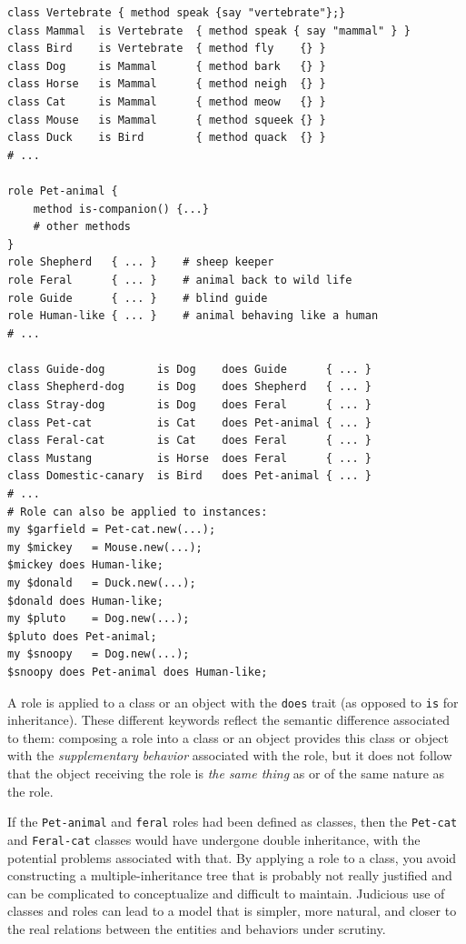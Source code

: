 \begin{verbatim}
class Vertebrate { method speak {say "vertebrate"};}
class Mammal  is Vertebrate  { method speak { say "mammal" } }
class Bird    is Vertebrate  { method fly    {} }
class Dog     is Mammal      { method bark   {} }
class Horse   is Mammal      { method neigh  {} }
class Cat     is Mammal      { method meow   {} }
class Mouse   is Mammal      { method squeek {} }
class Duck    is Bird        { method quack  {} }
# ...

role Pet-animal { 
    method is-companion() {...} 
    # other methods
}
role Shepherd   { ... }    # sheep keeper
role Feral      { ... }    # animal back to wild life
role Guide      { ... }    # blind guide
role Human-like { ... }    # animal behaving like a human
# ...

class Guide-dog        is Dog    does Guide      { ... }
class Shepherd-dog     is Dog    does Shepherd   { ... }
class Stray-dog        is Dog    does Feral      { ... }
class Pet-cat          is Cat    does Pet-animal { ... }
class Feral-cat        is Cat    does Feral      { ... }
class Mustang          is Horse  does Feral      { ... }
class Domestic-canary  is Bird   does Pet-animal { ... }
# ...
# Role can also be applied to instances:
my $garfield = Pet-cat.new(...);
my $mickey   = Mouse.new(...);
$mickey does Human-like;
my $donald   = Duck.new(...);
$donald does Human-like;
my $pluto    = Dog.new(...);
$pluto does Pet-animal;
my $snoopy   = Dog.new(...);
$snoopy does Pet-animal does Human-like;
\end{verbatim}
 
A role is applied to a class or an object with the {\tt does} 
trait (as opposed to {\tt is} for inheritance). These 
different keywords reflect the semantic difference associated 
to them: composing a role into a class or an object provides 
this class or object with the \emph{supplementary behavior} associated with 
the role, but it does not follow that the object receiving 
the role is \emph{the same thing} as or of the same nature 
as the role.

If the {\tt Pet-animal} and {\tt feral} roles had been defined 
as classes, then the {\tt Pet-cat} and {\tt Feral-cat} classes 
would have undergone double inheritance, with the potential 
problems associated with that. By applying a role to a 
class, you avoid constructing a multiple-inheritance tree 
that is probably not really justified and can be complicated 
to conceptualize and difficult to maintain. Judicious use 
of classes and roles can lead to a model that is simpler, 
more natural, and closer to the real relations between the 
entities and behaviors under scrutiny.

